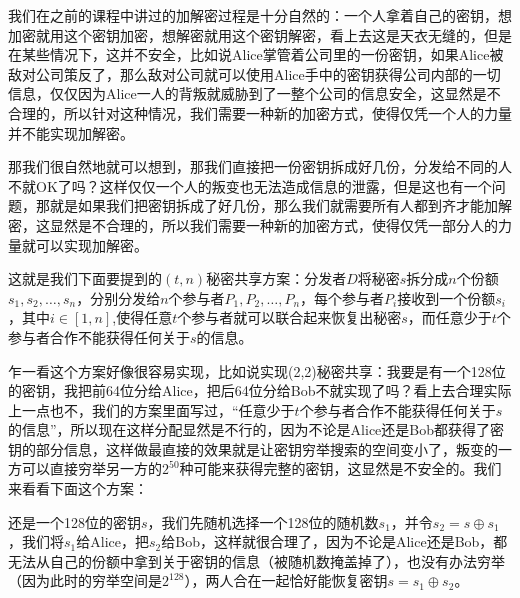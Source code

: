 \documentclass[12pt, a4paper, oneside]{ctexart}
\begin{document}
我们在之前的课程中讲过的加解密过程是十分自然的：一个人拿着自己的密钥，想加密就用这个密钥加密，想解密就用这个密钥解密，看上去这是天衣无缝的，但是在某些情况下，这并不安全，比如说Alice掌管着公司里的一份密钥，如果Alice被敌对公司策反了，那么敌对公司就可以使用Alice手中的密钥获得公司内部的一切信息，仅仅因为Alice一人的背叛就威胁到了一整个公司的信息安全，这显然是不合理的，所以针对这种情况，我们需要一种新的加密方式，使得仅凭一个人的力量并不能实现加解密。

那我们很自然地就可以想到，那我们直接把一份密钥拆成好几份，分发给不同的人不就OK了吗？这样仅仅一个人的叛变也无法造成信息的泄露，但是这也有一个问题，那就是如果我们把密钥拆成了好几份，那么我们就需要所有人都到齐才能加解密，这显然是不合理的，所以我们需要一种新的加密方式，使得仅凭一部分人的力量就可以实现加解密。


这就是我们下面要提到的$(t,n)$秘密共享方案：分发者$D$将秘密$s$拆分成$n$个份额$s_1,s_2,\ldots,s_n$，分别分发给$n$个参与者$P_1,P_2,\ldots,P_n$，每个参与者$P_i$接收到一个份额$s_i$，其中$i\in [1,n]$,使得任意$t$个参与者就可以联合起来恢复出秘密$s$，而任意少于$t$个参与者合作不能获得任何关于$s$的信息。

乍一看这个方案好像很容易实现，比如说实现(2,2)秘密共享：我要是有一个128位的密钥，我把前64位分给Alice，把后64位分给Bob不就实现了吗？看上去合理实际上一点也不，我们的方案里面写过，“任意少于$t$个参与者合作不能获得任何关于$s$的信息”，所以现在这样分配显然是不行的，因为不论是Alice还是Bob都获得了密钥的部分信息，这样做最直接的效果就是让密钥穷举搜索的空间变小了，叛变的一方可以直接穷举另一方的$2^50$种可能来获得完整的密钥，这显然是不安全的。我们来看看下面这个方案：

还是一个128位的密钥$s$，我们先随机选择一个128位的随机数$s_1$，并令$s_2=s\oplus s_1$，我们将$s_1$给Alice，把$s_2$给Bob，这样就很合理了，因为不论是Alice还是Bob，都无法从自己的份额中拿到关于密钥的信息（被随机数掩盖掉了），也没有办法穷举（因为此时的穷举空间是$2^{128}$），两人合在一起恰好能恢复密钥$s=s_1\oplus s_2$。
\end{document}
